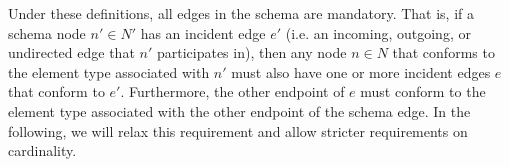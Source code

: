 \documentclass[a4paper]{article}
\begin{document}
Under these definitions, all edges in the schema are mandatory. That is, if a schema node $n' \in N'$ has an incident edge $e'$ (i.e. an incoming, outgoing, or undirected edge that $n'$ participates in), then any node $n \in N$ that conforms to the element type associated with $n'$ must also have one or more incident edges $e$ that conform to $e'$. Furthermore, the other endpoint of $e$ must conform to the element type associated with the other endpoint of the schema edge. In the following, we will relax this requirement and allow stricter requirements on cardinality.

\end{document}
